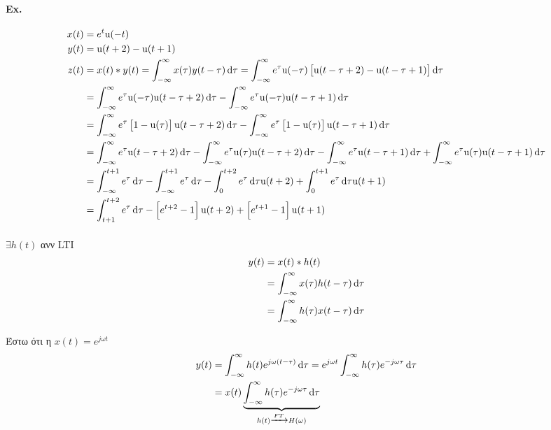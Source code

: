 \documentclass[11pt,a4paper,titlepage,fleqn]{article}
\begin{document}
	\paragraph{Ex.}
	\begin{align*}
	x(t) &= e^t\mathrm u(-t) \\
	y(t) &= \mathrm u(t+2)-\mathrm u(t+1) \\
	z(t) &= x(t) * y(t) = \int_{-\infty}^{\infty} x(\tau)y(t-\tau)\dif\tau
	= \int_{-\infty}^{\infty} e^\tau\mathrm u(-\tau)\left[
	\mathrm u(t-\tau+2)-\mathrm u(t-\tau+1)
	\right]\dif\tau
	\\ &= \int_{-\infty}^{\infty} e^\tau
	\mathrm u(-\tau)\mathrm u(t-\tau+2)\dif\tau - \int_{-\infty}^{\infty}
	e^\tau \mathrm u(-\tau)\mathrm u(t-\tau+1)\dif\tau
	\\ &= \int_{-\infty}^{\infty} e^\tau
	\left[ 1-\mathrm u(\tau) \right]\mathrm u(t-\tau+2)\dif\tau -
	\int_{-\infty}^{\infty} e^\tau \left[ 1-\mathrm u(\tau) \right]
	\mathrm u(t-\tau+1)\dif\tau
	\\ &= \int_{-\infty}^{\infty} e^\tau \mathrm u(t-\tau+2)\dif\tau
	- \int_{-\infty}^{\infty} e^\tau \mathrm u(\tau) \mathrm u(t-\tau+2)\dif\tau
	- \int_{-\infty}^{\infty} e^\tau \mathrm u(t-\tau+1)\dif\tau
	+ \int_{-\infty}^{\infty} e^\tau \mathrm u(\tau)\mathrm u(t-\tau+1)\dif\tau
	\\ &= \int_{-\infty}^{t+1} e^\tau\dif\tau - \int_{-\infty}^{t+1}e^\tau\dif\tau
	- \int_0^{t+2}e^\tau\dif\tau\mathrm u(t+2)
	+ \int_0^{t+1}e^\tau\dif\tau \mathrm u(t+1)
	\\ &= \int_{t+1}^{t+2}e^\tau\dif\tau
	-\left[ e^{t+2}-1 \right]\mathrm u(t+2)
	+\left[ e^{t+1}-1 \right]\mathrm u(t+1)
	\end{align*}
	
	
	\paragraph{}
	\( \exists h(t) \) ανν LTI
	\begin{align*}
		y(t) &= x(t)*h(t) \\ &=\int_{-\infty}^{\infty} x(\tau)h(t-\tau)\dif\tau
		\\ &= \int_{-\infty}^{\infty} h(\tau)x(t-\tau)\dif\tau
	\end{align*}
	
	Έστω ότι η \( x(t) = e^{j\omega t} \)
	\begin{align*}
	y(t) &= \int_{-\infty}^{\infty} h(t) e^{j\omega(t-\tau)}\dif\tau 
	= e^{j\omega t} \int_{-\infty}^{\infty} h(\tau)e^{-j\omega\tau}\dif\tau
	\\ &= x(t)\underbrace{\int_{-\infty}^{\infty} h(\tau)e^{-j\omega\tau}\dif\tau}_{\mathclap{h(t) \xrightarrow{FT} H(\omega)}}
	\end{align*}
	
\end{document}
